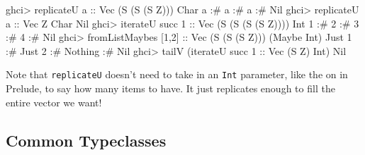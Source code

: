 \documentclass[]{article}
\newenvironment{Shaded}{}{}
\newcommand{\CharTok}[1]{\textcolor[rgb]{0.25,0.44,0.63}{#1}}
\newcommand{\DataTypeTok}[1]{\textcolor[rgb]{0.56,0.13,0.00}{#1}}
\newcommand{\DecValTok}[1]{\textcolor[rgb]{0.25,0.63,0.44}{#1}}
\newcommand{\FunctionTok}[1]{\textcolor[rgb]{0.02,0.16,0.49}{#1}}
\newcommand{\NormalTok}[1]{#1}
\newcommand{\OperatorTok}[1]{\textcolor[rgb]{0.40,0.40,0.40}{#1}}
\newcommand{\OtherTok}[1]{\textcolor[rgb]{0.00,0.44,0.13}{#1}}
\begin{document}
\begin{Shaded}
\begin{Highlighting}[]
\NormalTok{ghci}\OperatorTok{>}\NormalTok{ replicateU }\CharTok{\textquotesingle{}a\textquotesingle{}}\OtherTok{       ::} \DataTypeTok{Vec}\NormalTok{ (}\DataTypeTok{S}\NormalTok{ (}\DataTypeTok{S}\NormalTok{ (}\DataTypeTok{S} \DataTypeTok{Z}\NormalTok{))) }\DataTypeTok{Char}
\CharTok{\textquotesingle{}a\textquotesingle{}} \OperatorTok{:\#} \CharTok{\textquotesingle{}a\textquotesingle{}} \OperatorTok{:\#} \CharTok{\textquotesingle{}a\textquotesingle{}} \OperatorTok{:\#} \DataTypeTok{Nil}
\NormalTok{ghci}\OperatorTok{>}\NormalTok{ replicateU }\CharTok{\textquotesingle{}a\textquotesingle{}}\OtherTok{       ::} \DataTypeTok{Vec} \DataTypeTok{Z} \DataTypeTok{Char}
\DataTypeTok{Nil}
\NormalTok{ghci}\OperatorTok{>}\NormalTok{ iterateU }\FunctionTok{succ} \DecValTok{1}\OtherTok{      ::} \DataTypeTok{Vec}\NormalTok{ (}\DataTypeTok{S}\NormalTok{ (}\DataTypeTok{S}\NormalTok{ (}\DataTypeTok{S}\NormalTok{ (}\DataTypeTok{S} \DataTypeTok{Z}\NormalTok{)))) }\DataTypeTok{Int}
\DecValTok{1} \OperatorTok{:\#} \DecValTok{2} \OperatorTok{:\#} \DecValTok{3} \OperatorTok{:\#} \DecValTok{4} \OperatorTok{:\#} \DataTypeTok{Nil}
\NormalTok{ghci}\OperatorTok{>}\NormalTok{ fromListMaybes [}\DecValTok{1}\NormalTok{,}\DecValTok{2}\NormalTok{]}\OtherTok{ ::} \DataTypeTok{Vec}\NormalTok{ (}\DataTypeTok{S}\NormalTok{ (}\DataTypeTok{S}\NormalTok{ (}\DataTypeTok{S} \DataTypeTok{Z}\NormalTok{))) (}\DataTypeTok{Maybe} \DataTypeTok{Int}\NormalTok{)}
\DataTypeTok{Just} \DecValTok{1} \OperatorTok{:\#} \DataTypeTok{Just} \DecValTok{2} \OperatorTok{:\#} \DataTypeTok{Nothing} \OperatorTok{:\#} \DataTypeTok{Nil}
\NormalTok{ghci}\OperatorTok{>}\NormalTok{ tailV (iterateU }\FunctionTok{succ} \DecValTok{1}\OtherTok{ ::} \DataTypeTok{Vec}\NormalTok{ (}\DataTypeTok{S} \DataTypeTok{Z}\NormalTok{) }\DataTypeTok{Int}\NormalTok{)}
\DataTypeTok{Nil}
\end{Highlighting}
\end{Shaded}

Note that \texttt{replicateU} doesn't need to take in an \texttt{Int} parameter,
like the on in Prelude, to say how many items to have. It just replicates enough
to fill the entire vector we want!

\hypertarget{common-typeclasses}{%
\subsection{Common Typeclasses}\label{common-typeclasses}}
\end{document}
